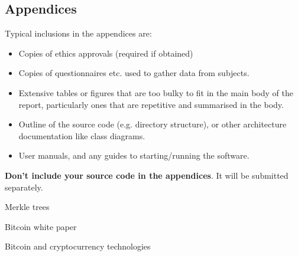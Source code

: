 \documentclass{l4proj}
\begin{document}
%
% 

\begin{appendices}

\chapter{Appendices}

Typical inclusions in the appendices are:

\begin{itemize}
\item
  Copies of ethics approvals (required if obtained)
\item
  Copies of questionnaires etc. used to gather data from subjects.
\item
  Extensive tables or figures that are too bulky to fit in the main body of
  the report, particularly ones that are repetitive and summarised in the body.

\item Outline of the source code (e.g. directory structure), or other architecture documentation like class diagrams.

\item User manuals, and any guides to starting/running the software.

\end{itemize}

\textbf{Don't include your source code in the appendices}. It will be
submitted separately.

\end{appendices}






Merkle trees

Bitcoin white paper

Bitcoin and cryptocurrency technologies
\end{document}
